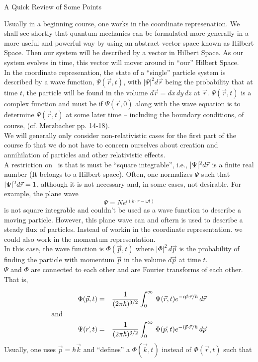  \centerline{A Quick Review of Some Points}
  
 Usually in a beginning course, one works in the coordinate represenation. We shall see shortly that quantum mechanics can be formulated more
 generally in a more useful and powerful way by using an abstract vector space known as Hilbert Space. Then our system will be described by a 
 vector in Hilbert Space. As our system evolves in time, this vector will mover around in ``our'' Hilbert Space. \\
 
 In the coordinate represenation, the state of a ``single'' particle system is described by a wave function, $\Psi(\vec{r},t)$, with $|\Psi|^2 d\vec{r}$ being
 the probability that at time $t$, the particle will be found in the volume $d\vec{r} = dx\,dy\,dz$ at $\vec{r}$. $\Psi(\vec{r},t)$ is a complex function
 and must be if $\Psi(\vec{r},0)$ along with the wave equation is to determine $\Psi(\vec{r},t)$ at some later time -- including the boundary conditions, 
 of course, (cf. Merzbacher pp. 14-18).\\

We will generally only consider non-relativistic cases for the first part of the course fo that we do not have to concern ourselves about creation
and annihilation of particles and other relativistic effects.\\

A restriction on \Wftn\ is that is must be ``square integrable'', i.e., $|\Psi|^2 d\vec{r}$ is a finite real number (It belongs to a Hilbert space). Often, one normalizes
$\Psi$ such that $|\Psi|^2 d\vec{r} = 1$, although it is not necessary and, in some cases, not desirable. For example, the plane wave
$$\Psi = N e^{i(k\cdot r - \omega t)}$$ is not square integrable and couldn't be used as a wave function to describe a moving particle. However, this
plane wave can and oftern is used to describe a steady flux of particles. Instead of workin in the coordinate representation. we could also work in the momentum
representation.\\

In this case, the wave function is $\Phi(\vec{p},t)$ where $|\Phi|^2\, d\vec{p}$ is the probability of finding the particle with momentum $\vec{p}$ in the volume
$d\vec{p}$ at time $t$. \\

$\Psi$ and $\Phi$ are connected to each other and are Fourier transforms of each other. That is, 

 \begin{eqnarray*}
  \Phi(\vec{p},t) &=& {1\over (2\pi\hbar)^{3/2}} \int_0^\infty \, \Psi(\vec{r},t)e^{-i\vec{p}\cdot\vec{r}/\hbar}\, d\vec{r} \\ 
  \hbox{and~~~~~~~~~~~~~~~\hfill} &\null&\\
  \Psi(\vec{r},t) &=& {1\over (2\pi\hbar)^{3/2}} \int_0^\infty \, \Phi(\vec{p},t)e^{-i\vec{p}\cdot\vec{r}/\hbar}\, d\vec{p} 
 \end{eqnarray*}Usually, one uses $\vec{p} = \hbar\vec{k}$ and ``defines'' a $\Phi(\vec{k},t)$ instead of $\Phi(\vec{r},t)$ such that 
  
